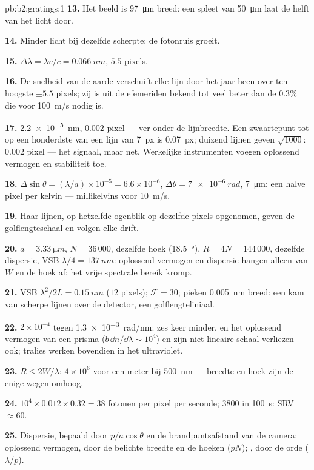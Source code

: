 \begin{solution}{pb:b2:gratings:1}
\textbf{13.} Het beeld is \qty{97}{\micro m} breed: een spleet van
\qty{50}{\micro m} laat
de helft van het licht door.

\textbf{14.} Minder licht bij dezelfde scherpte: de fotonruis groeit.

\textbf{15.} $\Delta\lambda = \lambda v/c = \qty{0.066}{nm}$, $5.5$ pixels.

\textbf{16.} De snelheid van de aarde verschuift elke lijn door het jaar
heen over ten hoogste $\pm5.5$
pixels; zij is uit de efemeriden bekend tot veel
beter dan de $0.3\%$ die voor \qty{100}{m/s} nodig is.

\textbf{17.} \qty{2.2e-5}{nm}, $0.002$ pixel --- ver onder de lijnbreedte. Een
zwaartepunt tot op een honderdste van een lijn van \qty{7}{px} is
\qty{0.07}{px}; duizend
lijnen geven $\sqrt{1000}$: $0.002$ pixel --- het signaal, maar net. Werkelijke
instrumenten voegen oplossend vermogen en stabiliteit toe.

\textbf{18.}
$\Delta\sin\theta = (\lambda/a) \times 10^{-5} = 6.6 \times 10^{-6}$,
$\Delta\theta = \qty{7e-6}{rad}$,
\qty{7}{\micro m}: een halve pixel per kelvin --- millikelvins voor \qty{10}{m/s}.

\textbf{19.} Haar lijnen, op hetzelfde ogenblik op dezelfde pixels
opgenomen, geven de golflengteschaal en volgen elke drift.

\textbf{20.} $a = \qty{3.33}{\micro m}$, $N = 36\,000$, dezelfde hoek
(\qty{18.5}{\degree}), $R = 4N
= 144\,000$, dezelfde dispersie, VSB
$\lambda/4 = \qty{137}{nm}$: oplossend vermogen en
dispersie hangen alleen van $W$ en de hoek af; het vrije spectrale bereik
kromp.

\textbf{21.} VSB $\lambda^2/2L = \qty{0.15}{nm}$ ($12$ pixels);
$\mathcal F = 30$; pieken
\qty{0.005}{nm} breed: een kam van scherpe lijnen over de detector, een
golflengteliniaal.

\textbf{22.} $2 \times 10^{-4}$ tegen \qty{1.3e-3}{rad/nm}: zes keer minder, en het
oplossend vermogen van een prisma ($b\,\dd n/\dd\lambda \sim 10^4$) en zijn
niet-lineaire schaal
verliezen ook; tralies werken bovendien in het ultraviolet.

\textbf{23.} $R \le 2W/\lambda$: $4 \times 10^6$ voor een meter bij
\qty{500}{nm} --- breedte en
hoek zijn de enige wegen omhoog.

\textbf{24.} $10^4 \times 0.012 \times 0.32 = 38$ fotonen per pixel per
seconde; $3800$
in \qty{100}{s}: SRV $\approx 60$.

\textbf{25.} Dispersie, bepaald door $p/a\cos\theta$ en de brandpuntsafstand
van de camera;
oplossend vermogen, door de belichte breedte en de hoeken ($pN$);
, door de orde ($\lambda/p$).
\end{solution}
